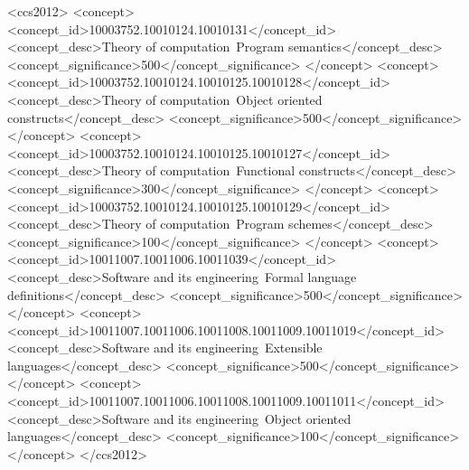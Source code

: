 \begin{CCSXML}
  <ccs2012>
  <concept>
  <concept_id>10003752.10010124.10010131</concept_id>
  <concept_desc>Theory of computation~Program semantics</concept_desc>
  <concept_significance>500</concept_significance>
  </concept>
  <concept>
  <concept_id>10003752.10010124.10010125.10010128</concept_id>
  <concept_desc>Theory of computation~Object oriented constructs</concept_desc>
  <concept_significance>500</concept_significance>
  </concept>
  <concept>
  <concept_id>10003752.10010124.10010125.10010127</concept_id>
  <concept_desc>Theory of computation~Functional constructs</concept_desc>
  <concept_significance>300</concept_significance>
  </concept>
  <concept>
  <concept_id>10003752.10010124.10010125.10010129</concept_id>
  <concept_desc>Theory of computation~Program schemes</concept_desc>
  <concept_significance>100</concept_significance>
  </concept>
  <concept>
  <concept_id>10011007.10011006.10011039</concept_id>
  <concept_desc>Software and its engineering~Formal language definitions</concept_desc>
  <concept_significance>500</concept_significance>
  </concept>
  <concept>
  <concept_id>10011007.10011006.10011008.10011009.10011019</concept_id>
  <concept_desc>Software and its engineering~Extensible languages</concept_desc>
  <concept_significance>500</concept_significance>
  </concept>
  <concept>
  <concept_id>10011007.10011006.10011008.10011009.10011011</concept_id>
  <concept_desc>Software and its engineering~Object oriented languages</concept_desc>
  <concept_significance>100</concept_significance>
  </concept>
  </ccs2012>
\end{CCSXML}



\maketitle

